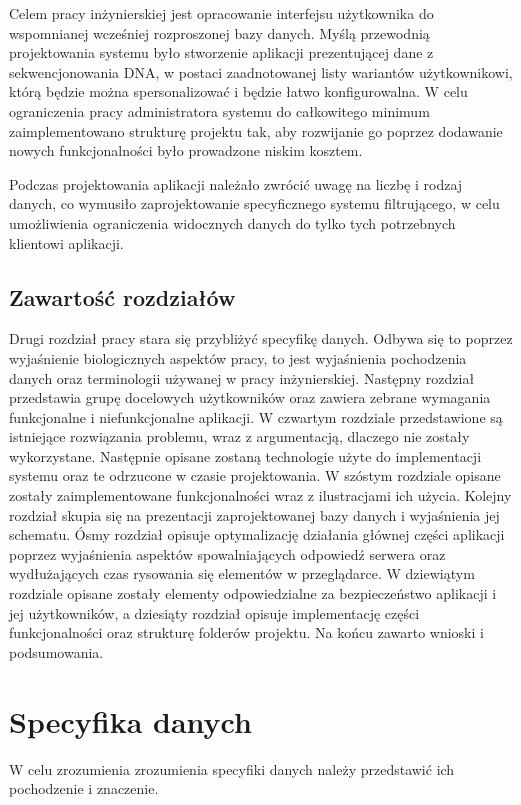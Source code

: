 \documentclass[a4paper,12pt,twoside]{article}
\begin{document}
Celem pracy inżynierskiej jest opracowanie
interfejsu użytkownika do wspomnianej wcześniej
rozproszonej bazy danych.
Myślą przewodnią projektowania systemu było stworzenie aplikacji
prezentującej dane z sekwencjonowania DNA,
w postaci zaadnotowanej listy wariantów użytkownikowi, którą będzie
można spersonalizować i będzie łatwo konfigurowalna.
W celu ograniczenia pracy administratora systemu do
całkowitego minimum zaimplementowano strukturę projektu
tak, aby rozwijanie go poprzez dodawanie nowych funkcjonalności było
prowadzone niskim kosztem.

Podczas projektowania aplikacji należało zwrócić uwagę na
liczbę i rodzaj danych, co wymusiło zaprojektowanie specyficznego systemu
filtrującego, w celu umożliwienia ograniczenia widocznych danych
do tylko tych potrzebnych klientowi aplikacji.

\subsection{Zawartość rozdziałów}
Drugi rozdział pracy stara się przybliżyć specyfikę danych.
Odbywa się to poprzez wyjaśnienie biologicznych aspektów pracy, to jest
wyjaśnienia pochodzenia danych oraz terminologii używanej w pracy inżynierskiej.
Następny rozdział przedstawia grupę docelowych użytkowników oraz zawiera zebrane wymagania funkcjonalne i niefunkcjonalne aplikacji.
W czwartym rozdziale przedstawione są istniejące rozwiązania problemu, wraz
z argumentacją, dlaczego nie zostały wykorzystane.
Następnie opisane zostaną technologie użyte do implementacji systemu oraz te odrzucone w czasie projektowania.
W szóstym rozdziale opisane zostały zaimplementowane funkcjonalności
wraz z ilustracjami ich użycia. Kolejny rozdział skupia się
na prezentacji zaprojektowanej bazy danych i wyjaśnienia
jej schematu. Ósmy rozdział opisuje optymalizację działania głównej
części aplikacji poprzez wyjaśnienia aspektów spowalniających
odpowiedź serwera oraz wydłużających czas rysowania się elementów w
przeglądarce.
W dziewiątym rozdziale opisane zostały elementy odpowiedzialne za
bezpieczeństwo aplikacji i jej użytkowników, a dziesiąty rozdział
opisuje implementację części funkcjonalności oraz strukturę folderów projektu.
Na końcu zawarto wnioski i podsumowania.

\newpage
\section{Specyfika danych}
W celu zrozumienia zrozumienia specyfiki danych należy przedstawić ich pochodzenie
i znaczenie.
\end{document}
